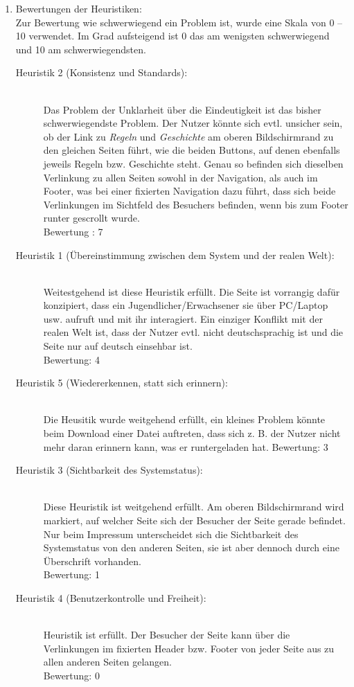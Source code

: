 \documentclass{scrartcl}
\begin{document}
\begin{enumerate}
\item Bewertungen der Heuristiken:\\ 
Zur Bewertung wie schwerwiegend ein Problem ist, wurde eine Skala von 0 – 10 verwendet. Im
Grad aufsteigend ist 0 das am wenigsten schwerwiegend und 10 am schwerwiegendsten.
\begin{description}
\item[Heuristik 2 (Konsistenz und Standards):] \ \\
Das Problem der Unklarheit über die Eindeutigkeit ist das bisher schwerwiegendste Problem.
Der Nutzer könnte sich evtl. unsicher sein, ob der Link zu \textit{Regeln} und \textit{Geschichte} am oberen Bildschirmrand zu den gleichen Seiten führt, wie die beiden Buttons, auf denen ebenfalls jeweils Regeln bzw. Geschichte steht.
Genau so befinden sich dieselben Verlinkung zu allen Seiten sowohl in der Navigation, als auch im Footer, was bei einer fixierten Navigation dazu führt, dass sich beide Verlinkungen im Sichtfeld des Besuchers befinden, wenn bis zum Footer runter gescrollt wurde.\\
Bewertung : 7
\item[Heuristik 1 (Übereinstimmung zwischen dem System und der realen Welt):] \ \\
Weitestgehend ist diese Heuristik erfüllt. Die Seite ist vorrangig dafür konzipiert, dass ein Jugendlicher/Erwachsener sie über PC/Laptop usw. aufruft und mit ihr interagiert. Ein einziger Konflikt mit der
realen Welt ist, dass der Nutzer evtl. nicht deutschsprachig ist und die Seite nur auf deutsch einsehbar ist.\\
Bewertung: 4
\item[Heuristik 5 (Wiedererkennen, statt sich erinnern):] \ \\
Die Heusitik wurde weitgehend erfüllt, ein kleines Problem könnte beim Download einer Datei auftreten, dass sich z. B. der Nutzer nicht mehr daran erinnern kann, was er runtergeladen hat.
Bewertung: 3
\item[Heuristik 3 (Sichtbarkeit des Systemstatus):] \ \\
Diese Heuristik ist weitgehend erfüllt. Am oberen Bildschirmrand wird markiert, auf welcher Seite sich der Besucher der Seite gerade befindet. Nur beim Impressum unterscheidet sich die Sichtbarkeit des Systemstatus von den anderen Seiten, sie ist aber dennoch durch eine Überschrift vorhanden.\\
Bewertung: 1
\item[Heuristik 4 (Benutzerkontrolle und Freiheit):] \ \\
Heuristik ist erfüllt. Der Besucher der Seite kann über die Verlinkungen im fixierten Header bzw. Footer von jeder Seite aus zu allen anderen Seiten gelangen.\\
Bewertung: 0
\end{description}


\end{enumerate}
\end{document}
